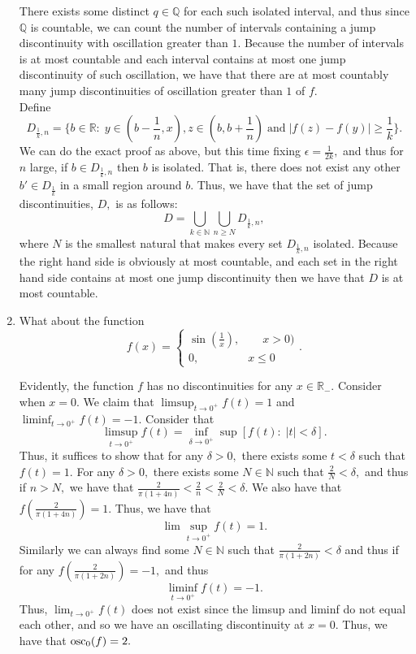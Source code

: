 \documentclass[11pt]{article}
\newcommand{\bbN}{\mathbb{N}}
\newcommand{\bbQ}{\mathbb{Q}}
\newcommand{\bbR}{\mathbb{R}}
\begin{document}
\begin{enumerate}
\begin{solution}
    There exists some distinct $q\in \bbQ$ for each such isolated interval, and thus since $\bbQ$ is countable, we can count the number of intervals containing a  jump discontinuity with oscillation greater than $1$. Because the number of intervals is at most countable and each interval contains at most one jump discontinuity of such oscillation, we have that there are at most countably many jump discontinuities of oscillation greater than $1$ of $f.$\\
    
    Define \[D_{\frac{1}{k}, n} = \{b\in \bbR: \; y\in (b-\frac{1}{n}, x), z\in (b, b+ \frac{1}{n}) \; \text{and}\; |f(z) - f(y)|\geq \frac{1}{k}\}.\] We can do the exact proof as above, but this time fixing $\epsilon = \frac{1}{2k},$ and thus for $n$ large, if $b\in D_{\frac{1}{k}, n}$ then $b$ is isolated. That is, there does not exist any other $b' \in D_{\frac{1}{k}}$ in a small region around $b.$ Thus, we have that the set of jump discontinuities, $D,$ is as follows:
    \[D =  \bigcup_{k\in \bbN}\bigcup_{n\geq N}D_{\frac{1}{k},n},\] where $N$ is the smallest natural that makes every set $D_{\frac{1}{k},n}$ isolated. Because the right hand side is obviously at most countable, and each set in the right hand side contains at most one jump discontinuity then we have that $D$ is at most countable.\\
    \end{solution}
    \item 
    \begin{problem}
        What about the function
        \[f(x) = 
        \begin{cases}
            \sin(\frac{1}{x}),\qquad x>0)\\
            0, \qquad \; \qquad x\leq 0
        \end{cases}.\]
    \end{problem}
    \begin{solution}
        Evidently, the function $f$ has no discontinuities for any $x\in \bbR_{-}.$ Consider when $x = 0.$ We claim that $\limsup_{t\to 0^+}f(t) = 1$ and $\liminf_{t\to 0^+}f(t)= -1.$ Consider that \[\limsup_{t\to 0^+}f(t) = \inf_{\delta \to 0^+}\sup[f(t):\; |t|<\delta].\] Thus, it suffices to show that for any $\delta>0,$ there exists some $t<\delta$ such that $f(t) = 1.$ For any $\delta>0,$ there exists some $N\in \bbN$ such that $\frac{2}{N}<\delta,$ and thus if $n>N,$ we have that $\frac{2}{\pi(1+4n)}<\frac{2}{n}<\frac{2}{N}<\delta.$ We also have that $f(\frac{2}{\pi(1+4n)}) = 1.$ Thus, we have that \[\lim\sup_{t\to 0^+}f(t) = 1.\] Similarly we can always find some $N \in \bbN$ such that $\frac{2}{\pi(1+2n)}<\delta$ and thus if for any $f(\frac{2}{\pi(1+2n)})  = -1,$ and thus 
        \[\liminf_{t\to 0^+}f(t) = -1.\] Thus, $\lim_{t\to 0^+}f(t)$ does not exist since the limsup and liminf do not equal each other, and so we have an oscillating discontinuity at $x=0.$
        Thus, we have that $\text{osc}_0(f) = 2.$\\
        

\end{solution}
\end{enumerate}
\end{document}
